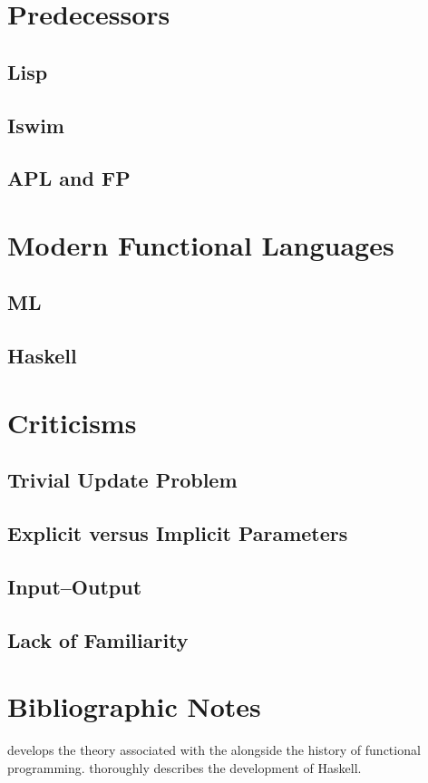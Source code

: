 \label{functional:languages}
\section{Predecessors}
\subsection{Lisp}

\subsection{Iswim}

\subsection{APL and FP}

\section{Modern Functional Languages}
\subsection{ML}

\subsection{Haskell}

\section{Criticisms}
\subsection{Trivial Update Problem}
\subsection{Explicit versus Implicit Parameters}
\subsection{Input--Output}
\subsection{Lack of Familiarity}

\section{Bibliographic Notes}
\citet{Hudak:Conception:1989} develops the theory associated with the \lambdacalc alongside the history of functional programming. \citet{Hudak:A-history:2007} thoroughly describes the development of Haskell.

